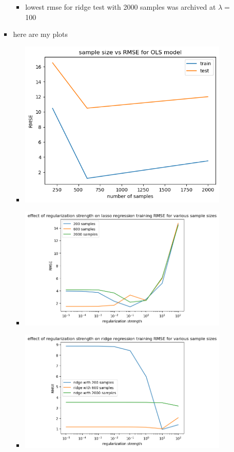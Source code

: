 \documentclass[12pt,twoside]{article}
\begin{document}
\begin{enumerate}
\begin{enumerate}
\begin{itemize}
\begin{itemize}
\item lowest rmse for ridge test with 2000 samples was archived at $\lambda=$ 100
\end{itemize}
\item here are my plots
\begin{itemize}
    \item \includegraphics[width=10cm]{homework/homework_12/immages/hw_12_1.png}
        \item \includegraphics[width=10cm]{homework/homework_12/immages/hw_12_2.png}
            \item \includegraphics[width=10cm]{homework/homework_12/immages/hw_12_3.png}

\end{itemize}
\end{itemize}
\end{enumerate}
\end{enumerate}
\end{document}
